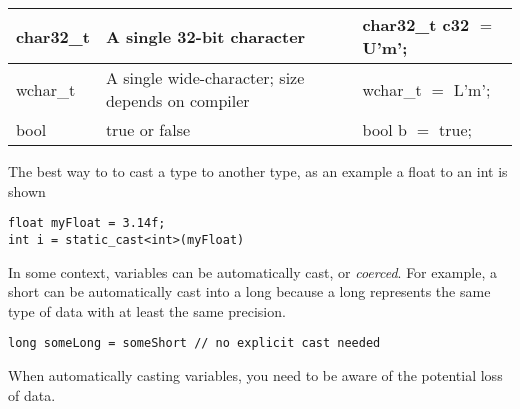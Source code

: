 \documentclass{article}
\begin{document}
\begin{center}
\begin{tabularx}{\textwidth}{
			| >{\raggedright\arraybackslash}X
			| >{\raggedright\arraybackslash}X
			| >{\raggedright\arraybackslash}X |
		}
		\hline
		char32\_t                                                                                                   & A single 32-bit character                                                                     & char32\_t c32 $=$ U'm';                                                                                                                                    \\
		\hline
		wchar\_t                                                                                                    & A single wide-character; size depends on compiler                                             & wchar\_t $=$ L'm';                                                                                                                                         \\
		\hline
		bool                                                                                                        & true or false                                                                                 & bool b $=$ true;                                                                                                                                           \\
		\hline
	\end{tabularx}
\end{center}
The best way to to cast a type to another type, as an example a float to an int is shown
\begin{verbatim}
float myFloat = 3.14f;
int i = static_cast<int>(myFloat)
\end{verbatim}
In some context, variables can be automatically cast, or \textit{coerced}. For example, a short
can be automatically cast into a long because a long represents the same type
of data with at least the same precision.
\begin{verbatim}
long someLong = someShort // no explicit cast needed
\end{verbatim}
When automatically casting variables, you need to be aware of the potential loss of data.
\end{document}
